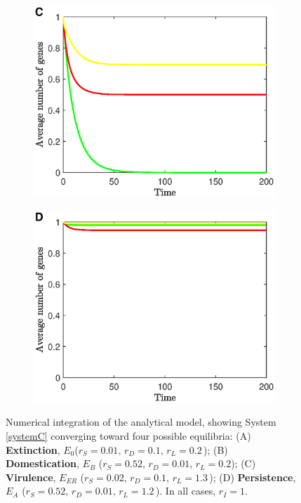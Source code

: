 \begin{figure}[H]
\begin{subfigure}[t]{0.50\textwidth}
        \includegraphics[scale=0.50]{E_li}
    \end{subfigure}\hfill   \begin{subfigure}[t]{0.50\textwidth}
    \includegraphics[scale=0.50]{E_lib}
    \end{subfigure} 
     \caption[Numerical integration of the analytical model.]{Numerical integration of the analytical model, showing System \ref{systemC} converging toward four possible equilibria: (A) {\bf Extinction}, $E_0$($r_S = 0.01 , \, r_D =0.1 , \, r_L =0.2 \, $);  (B) {\bf Domestication}, $E_B$ ($r_S = 0.52 , \, r_D =0.01 , \, r_L =0.2  $); (C) {\bf Virulence}, $E_{ER}$ ($r_S = 0.02 , \, r_D =0.1 , \, r_L =1.3  \, $); (D) {\bf Persistence}, $E_A$ ($r_S = 0.52 , \, r_D =0.01 , \, r_L =1.2  \, $).  In all cases, $r_I=1$.}
     \label{fig:mathresults}
     \end{figure}
